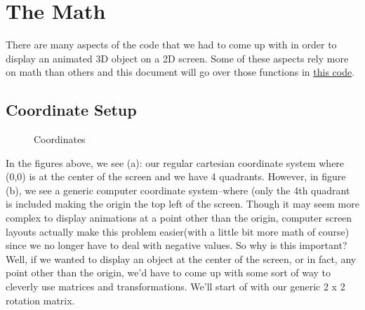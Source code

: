 \documentclass[14pt]{article}
\begin{document}
\newpage

\section*{The Math}

There are many aspects of the code that we had to come up with in order to display an animated 3D object on a 2D screen. Some of these aspects rely more on math than others and this document will go over those functions in \textcolor{blue}{\href{https://github.com/itsmehere/SpinningCube/blob/main/cubeProj.py}{this code}}.

\subsection*{Coordinate Setup}

\begin{figure}[!htb]
    \centering
    \qquad
    \caption{Coordinates}%
    \label{fig:example}%
\end{figure}

In the figures above, we see (a): our regular cartesian coordinate system where (0,0) is at the center of the screen and we have 4 quadrants. However, in figure (b), we see a generic computer coordinate system--where (only the 4th quadrant is included making the origin the top left of the screen. Though it may seem more complex to display animations at a point other than the origin, computer screen layouts actually make this problem easier(with a little bit more math of course) since we no longer have to deal with negative values. So why is this important? Well, if we wanted to display an object at the center of the screen, or in fact, any point other than the origin, we'd have to come up with some sort of way to cleverly use matrices and transformations. We'll start of with our generic 2 x 2 rotation matrix.
\end{document}
